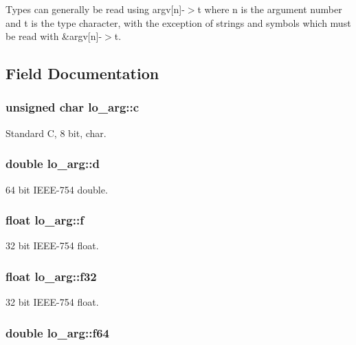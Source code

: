 Types can generally be read using argv\mbox{[}n\mbox{]}-\/$>$t where n is the argument number and t is the type character, with the exception of strings and symbols which must be read with \&argv\mbox{[}n\mbox{]}-\/$>$t. 

\subsection{Field Documentation}
\hypertarget{unionlo__arg_aa2e1c99864cf46e6b9cc52fb5cb214fe}{
\subsubsection[{c}]{\setlength{\rightskip}{0pt plus 5cm}unsigned char lo\+\_\+arg\+::c}}\label{unionlo__arg_aa2e1c99864cf46e6b9cc52fb5cb214fe}
Standard C, 8 bit, char. \hypertarget{unionlo__arg_a2a690890222baa5b9971f8772cb02535}{
\subsubsection[{d}]{\setlength{\rightskip}{0pt plus 5cm}double lo\+\_\+arg\+::d}}\label{unionlo__arg_a2a690890222baa5b9971f8772cb02535}
64 bit I\+E\+E\+E-\/754 double. \hypertarget{unionlo__arg_ad61c0f83abb077ce656b3a39d5c7e19f}{
\subsubsection[{f}]{\setlength{\rightskip}{0pt plus 5cm}float lo\+\_\+arg\+::f}}\label{unionlo__arg_ad61c0f83abb077ce656b3a39d5c7e19f}
32 bit I\+E\+E\+E-\/754 float. \hypertarget{unionlo__arg_a27ae2540e5e98e85826ccb7350b2ab20}{
\subsubsection[{f32}]{\setlength{\rightskip}{0pt plus 5cm}float lo\+\_\+arg\+::f32}}\label{unionlo__arg_a27ae2540e5e98e85826ccb7350b2ab20}
32 bit I\+E\+E\+E-\/754 float. \hypertarget{unionlo__arg_abf90442900450bb63d8d9bb4e60af4ee}{
\subsubsection[{f64}]{\setlength{\rightskip}{0pt plus 5cm}double lo\+\_\+arg\+::f64}}\label{unionlo__arg_abf90442900450bb63d8d9bb4e60af4ee}
